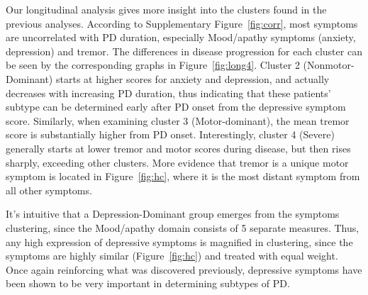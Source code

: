 \documentclass[preprint,5p]{elsarticle} %
\begin{document}

Our longitudinal analysis gives more insight into the clusters found in the previous analyses.
According to Supplementary Figure~\ref{fig:corr}, most symptoms are uncorrelated with PD duration, especially
Mood/apathy symptoms (anxiety, depression) and tremor.
The differences in disease progression for each cluster can be seen by the corresponding graphs in
Figure~\ref{fig:long4}. Cluster 2 (Nonmotor-Dominant) starts at higher
scores for anxiety and depression, and actually decreases with increasing PD duration, thus indicating that these patients' subtype can be determined
early after PD onset from the depressive symptom score. Similarly, when examining cluster 3
(Motor-dominant), the mean tremor score is substantially higher from PD onset.
Interestingly, cluster 4 (Severe) generally starts at lower tremor and motor scores during disease,
but then rises sharply, exceeding other clusters. More evidence that tremor is a unique motor
symptom is located in Figure~\ref{fig:hc}, where it is the most distant symptom from all other
symptoms.



It's intuitive that a Depression-Dominant group emerges from the symptoms clustering, since the
Mood/apathy domain consists of 5 separate measures. Thus, any high expression of depressive
symptoms is magnified in clustering, since the symptoms are highly similar (Figure~\ref{fig:hc})
and treated with equal weight. Once again reinforcing what was discovered previously, depressive
symptoms have been shown to be very important in determining subtypes of PD.
\end{document}
